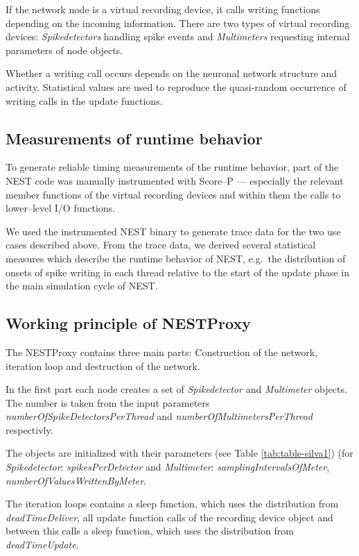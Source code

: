 \documentclass[]{YIC2015}
\begin{document}
If the network node is a virtual recording device, it calls writing
functions depending on the incoming information. There are two types
of virtual recording devices: \emph{Spikedetectors} handling spike
events and \emph{Multimeters} requesting internal parameters of node
objects.

Whether a writing call occurs depends on the neuronal network
structure and activity. Statistical values are used to reproduce the
quasi-random occurrence of writing calls in the update functions.

\subsection{Measurements of runtime behavior}

To generate reliable timing measurements of the runtime behavior, part
of the NEST code was manually instrumented with Score--P \cite{ScoreP}
--- especially the relevant member functions of the virtual recording
devices and within them the calls to lower--level I/O functions.

We used the instrumented NEST binary to generate trace data for the
two use cases described above. From the trace data, we derived several
statistical measures which describe the runtime behavior of NEST,
e.g.~the distribution of onsets of spike writing in each thread
relative to the start of the update phase in the main simulation cycle
of NEST.

\subsection{Working principle of NESTProxy}

The NESTProxy contains three main parts: Construction of the network,
iteration loop and destruction of the network.

In the first part each node creates a set of \emph{Spikedetector} and
\emph{Multimeter} objects.  The number is taken from the input
parameters \emph{numberOfSpikeDetectorsPerThread} and
\emph{numberOfMultimetersPerThread} respectivly.

The objects are initialized with their parameters (see Table
\ref{tab:table-silva1}) (for \emph{Spikedetector}:
\emph{spikesPerDetector} and \emph{Multimeter}:
\emph{samplingIntervalsOfMeter}, \emph{numberOfValuesWrittenByMeter}.

The iteration loops contains a sleep function, which uses the
distribution from \emph{deadTimeDeliver}, all update function calls of
the recording device object and between this calls a sleep function,
which uses the distribution from \emph{deadTimeUpdate}.
\end{document}
